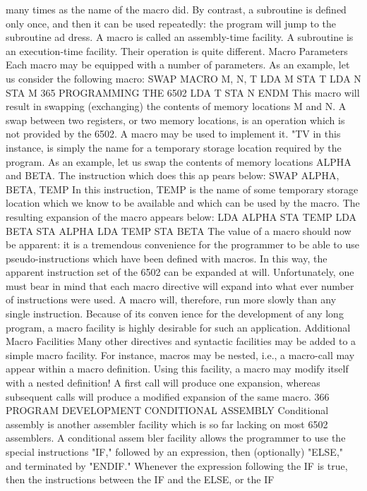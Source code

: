 {{{{{{{{{{{{{{{{{{{{{{{{{{{{{{{{{{{{{{{{{{{{{{{{{{{{{{{{{{{{{{{{{{{{{{{{{{{{{{{{{{{{{{{{{{{{{{{{{{{{{{{{{{{{{{{{{{{{{{{{{{{{{{{{{{{{{{{{{{{{many times as the name of the macro did.
By contrast, a subroutine is defined only once, and then it can
be used repeatedly: the program will jump to the subroutine ad
dress. A macro is called an assembly-time facility. A subroutine is
an execution-time facility. Their operation is quite different.
Macro Parameters
Each macro may be equipped with a number of parameters. As
an example, let us consider the following macro:
SWAP MACRO M, N, T
LDA M
STA T
LDA N
STA M
365
PROGRAMMING THE 6502
LDA T
STA N
ENDM
This macro will result in swapping (exchanging) the contents of
memory locations M and N. A swap between two registers, or two
memory locations, is an operation which is not provided by the
6502. A macro may be used to implement it. "TV in this instance,
is simply the name for a temporary storage location required by
the program. As an example, let us swap the contents of memory
locations ALPHA and BETA. The instruction which does this ap
pears below:
SWAP ALPHA, BETA, TEMP
In this instruction, TEMP is the name of some temporary storage
location which we know to be available and which can be used by
the macro. The resulting expansion of the macro appears below:
LDA ALPHA
STA TEMP
LDA BETA
STA ALPHA
LDA TEMP
STA BETA
The value of a macro should now be apparent: it is a tremendous
convenience for the programmer to be able to use pseudo-instructions
which have been defined with macros. In this way, the apparent
instruction set of the 6502 can be expanded at will. Unfortunately,
one must bear in mind that each macro directive will expand into what
ever number of instructions were used. A macro will, therefore, run
more slowly than any single instruction. Because of its conven
ience for the development of any long program, a macro facility
is highly desirable for such an application.
Additional Macro Facilities
Many other directives and syntactic facilities may be added to a
simple macro facility. For instance, macros may be nested, i.e., a
macro-call may appear within a macro definition. Using this facility,
a macro may modify itself with a nested definition! A first call will
produce one expansion, whereas subsequent calls will produce a
modified expansion of the same macro.
366
PROGRAM DEVELOPMENT
CONDITIONAL ASSEMBLY
Conditional assembly is another assembler facility which is
so far lacking on most 6502 assemblers. A conditional assem
bler facility allows the programmer to use the special instructions
"IF," followed by an expression, then (optionally) "ELSE," and
terminated by "ENDIF." Whenever the expression following the IF
is true, then the instructions between the IF and the ELSE, or the IF
}}}}}}}}}}}}}}}}}}}}}}}}}}}}}}}}}}}}}}}}}}}}}}}}}}}}}}}}}}}}}}}}}}}}}}}}}}}}}}}}}}}}}}}}}}}}}}}}}}}}}}}}}}}}}}}}}}}}}}}}}}}}}}}}}}}}}}}}}}}}
